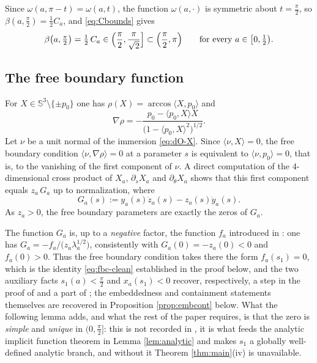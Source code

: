\documentclass[11pt,a4paper]{amsart}
\theoremstyle{plain}
\theoremstyle{definition}
\newcommand{\Sph}{\mathbb{S}}
\begin{document}
Since $\omega(a,\pi-t)=\omega(a,t)$, the function $\omega(a,\cdot)$ is symmetric about $t=\tfrac\pi2$, so $\beta(a,\tfrac\pi2)=\tfrac12C_a$, and \eqref{eq:Cbounds} gives
\begin{equation}\label{eq:beta-half}
\beta\bigl(a,\tfrac\pi2\bigr)=\tfrac12\,C_a\in\Bigl(\frac\pi2,\frac{\pi}{\sqrt2}\Bigr]\subset\Bigl(\frac\pi2,\pi\Bigr)\qquad\text{for every }a\in\bigl[0,\tfrac12\bigr).
\end{equation}




\subsection*{The free boundary function}

For $X\in\Sph^3\setminus\{\pm p_0\}$ one has $\rho(X)=\arccos\langle X,p_0\rangle$ and
\[
\nabla\rho=-\frac{p_0-\langle p_0,X\rangle X}{\bigl(1-\langle p_0,X\rangle^2\bigr)^{1/2}} .
\]
Let $\nu$ be a unit normal of the immersion \eqref{eq:dO-X}. Since $\langle\nu,X\rangle=0$, the free boundary condition $\langle\nu,\nabla\rho\rangle=0$ at a parameter $s$ is equivalent to $\langle\nu,p_0\rangle=0$, that is, to the vanishing of the first component of $\nu$. A direct computation of the $4$-dimensional cross product of $X_a$, $\partial_sX_a$ and $\partial_\theta X_a$ shows that this first component equals $z_a\,G_a$ up to normalization, where
\begin{equation}\label{eq:Ga}
G_a(s):=y_a(s)\dot z_a(s)-z_a(s)\dot y_a(s).
\end{equation}
As $z_a>0$, the free boundary parameters are exactly the zeros of $G_a$.

The function $G_a$ is, up to a \emph{negative} factor, the function $f_a$ introduced in \cite[Lem. 3.1]{dO24}: one has $G_a=-f_a/\bigl(z_a\lambda_a^{1/2}\bigr)$, consistently with $G_a(0)=-z_a(0)<0$ and $f_a(0)>0$. Thus the free boundary condition takes there the form $f_a(s_1)=0$, which is the identity \eqref{eq:fbc-clean} established in the proof below, and the two auxiliary facts $s_1(a)<\tfrac\pi2$ and $x_a(s_1)<0$ recover, respectively, a step in the proof of \cite[Prop. 3.3]{dO24} and a part of \cite[Prop. 3.4]{dO24}; the embeddedness and containment statements themselves are recovered in Proposition \ref{prop:embcont} below. What the following lemma adds, and what the rest of the paper requires, is that the zero is \emph{simple} and \emph{unique} in $(0,\tfrac\pi2]$: this is not recorded in \cite{dO24}, it is what feeds the analytic implicit function theorem in Lemma \ref{lem:analytic} and makes $s_1$ a globally well-defined analytic branch, and without it Theorem \ref{thm:main}(iv) is unavailable.
\end{document}

